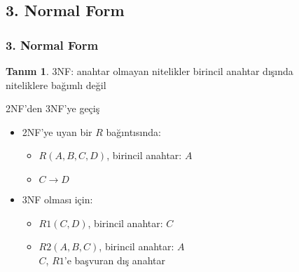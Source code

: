 \documentclass[dvipsnames]{beamer}
\theoremstyle{definition}
\newtheorem{tanim}[theorem]{Tanım}
\theoremstyle{example}
\theoremstyle{plain}
\begin{document}
\subsection{3. Normal Form}

\begin{frame}
  \frametitle{3. Normal Form}

  \begin{tanim}
    \alert{3NF}: anahtar olmayan nitelikler birincil anahtar dışında\\
      niteliklere bağımlı değil
  \end{tanim}

  \pause
  \begin{block}{2NF'den 3NF'ye geçiş}
    \begin{itemize}
      \item 2NF'ye uyan bir $R$ bağıntısında:
      \begin{itemize}
        \item $R(A,B,C,D)$, birincil anahtar: $A$
        \item $C \rightarrow D$
      \end{itemize}

      \pause
      \item 3NF olması için:
      \begin{itemize}
        \item $R1(C,D)$, birincil anahtar: $C$
        \item $R2(A,B,C)$, birincil anahtar: $A$\\
          $C$, $R1$'e başvuran dış anahtar
      \end{itemize}
    \end{itemize}
 \end{block}
\end{frame}
\end{document}
